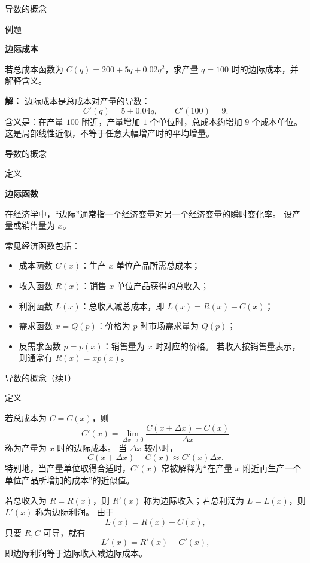\documentclass[aspectratio=169,10pt,fontset=fandol]{ctexbeamer}
\begin{document}
\begin{frame}[t,fragile]{导数的概念}
\normalsize
\begin{block}{例题}
{\normalsize
\textbf{边际成本}\par

若总成本函数为 $C(q)=200+5q+0.02q^2$，求产量 $q=100$ 时的边际成本，并解释含义。

}
\end{block}
\pause
{\normalsize
\textbf{解：}
边际成本是总成本对产量的导数：
\[
C'(q)=5+0.04q,\qquad C'(100)=9.
\]
含义是：在产量 $100$ 附近，产量增加 $1$ 个单位时，总成本约增加 $9$ 个成本单位。 这是局部线性近似，不等于任意大幅增产时的平均增量。

}
\end{frame}
\begin{frame}[t,fragile]{导数的概念}
\footnotesize
\begin{block}{定义}
{\footnotesize
\textbf{边际函数}\par

在经济学中，“边际”通常指一个经济变量对另一个经济变量的瞬时变化率。 设产量或销售量为 $x$。

常见经济函数包括：
\begin{itemize}
\item 成本函数 $C(x)$：生产 $x$ 单位产品所需总成本；
\item 收入函数 $R(x)$：销售 $x$ 单位产品获得的总收入；
\item 利润函数 $L(x)$：总收入减总成本，即 $L(x)=R(x)-C(x)$；
\item 需求函数 $x=Q(p)$：价格为 $p$ 时市场需求量为 $Q(p)$；
\item 反需求函数 $p=p(x)$：销售量为 $x$ 时对应的价格。 若收入按销售量表示，则通常有 $R(x)=xp(x)$。
\end{itemize}
}
\end{block}
\end{frame}
\begin{frame}[t,fragile]{导数的概念（续1）}
\footnotesize
\begin{block}{定义}
{\footnotesize


若总成本为 $C=C(x)$，则
\[
C'(x)=\lim_{\Delta x\to0}\frac{C(x+\Delta x)-C(x)}{\Delta x}
\]
称为产量为 $x$ 时的边际成本。 当 $\Delta x$ 较小时，
\[
C(x+\Delta x)-C(x)\approx C'(x)\Delta x.
\]
特别地，当产量单位取得合适时，$C'(x)$ 常被解释为“在产量 $x$ 附近再生产一个单位产品所增加的成本”的近似值。

若总收入为 $R=R(x)$，则 $R'(x)$ 称为边际收入；若总利润为 $L=L(x)$，则 $L'(x)$ 称为边际利润。 由于
\[
L(x)=R(x)-C(x),
\]
只要 $R,C$ 可导，就有
\[
L'(x)=R'(x)-C'(x),
\]
即边际利润等于边际收入减边际成本。

}
\end{block}
\end{frame}
\end{document}
